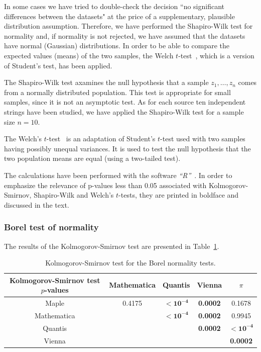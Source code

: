 \documentclass[%
 preprint,
 showpacs,
 showkeys,
 preprintnumbers,
 amsmath,amssymb,
 aps,
 prl,
  longbibliography,
 ]{revtex4-1}
\begin{document}
In some cases we have tried to double-check the decision  ``no significant
differences between the datasets"  at the price of a supplementary, plausible
distribution assumption. Therefore, we have performed the Shapiro-Wilk test  for normality
\cite{Shapiro-Wilk} and, if normality is not rejected, we have assumed that the
datasets have normal (Gaussian) distributions.
In order to be able to compare the expected values (means) of the two samples,
the Welch $t$-test~\cite{Welch}, which is a version of Student's test, has been applied.

The Shapiro-Wilk test axamines the null hypothesis that a sample
$z_{1},\ldots ,z_{n}$ comes from a normally distributed population. This test is
appropriate for small samples, since it is not an asymptotic test.
As for each
source ten independent strings have been studied, we have applied the
Shapiro-Wilk test for a sample size $n = 10$.

The Welch's $t$-test~\cite{Welch} is an adaptation of Student's $t$-test  used
with two samples having possibly unequal variances. It is used to test the
null hypothesis that the two population means are equal (using a two-tailed test).

The calculations
have been performed with the software {\em ``R''}~\cite{rproject}.
In order to emphasize the relevance of p-values less than 0.05 associated with Kolmogorov-Smirnov,
Shapiro-Wilk and Welch's $t$-tests, they are printed in boldface and discussed in the text.


\subsubsection{Borel test of normality}



The results of the Kolmogorov-Smirnov test are presented in Table~\ref{tab:5b}.

\begin{table}
\caption{Kolmogorov-Smirnov test for the Borel normality tests.}\label{tab:5b}
 \begin{center}
 \begin{tabular}
[c]{ c c c c c }
\hline\hline
Kolmogorov-Smirnov test $p$-values & Mathematica & Quantis & Vienna & $\pi$ \\\hline
Maple & 0.4175 &$\mathbf{< 10^{-4}}$%
& \bf{0.0002}
& 0.1678\\
Mathematica &  & $\mathbf{< 10^{-4}}$%
& \bf{0.0002} & 0.9945\\
Quantis &  &  & \bf{0.0002} & $\mathbf{< 10^{-4}}$%
\\
Vienna &  &  &  & \bf{0.0002}\\\hline\hline
\end{tabular}
\end{center}
\end{table}
\end{document}
